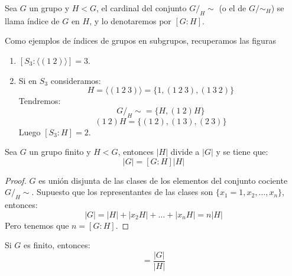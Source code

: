 \begin{definicion}
    Sea $G$ un grupo y $H< G$, el cardinal del conjunto $G/_H\sim$ (o el de $G/\sim_H$) se llama índice de $G$ en $H$, y lo denotaremos por $[G:H]$.
\end{definicion}

\begin{ejemplo}
    Como ejemplos de índices de grupos en subgrupos, recuperamos las figuras %
    \begin{enumerate}
        \item $[S_3 : \langle (1\ 2) \rangle ] = 3$.
        \item Si en $S_3$ consideramos:
            \begin{equation*}
                H = \langle (1\ 2\ 3) \rangle  = \{1, (1\ 2\ 3), (1\ 3\ 2)\}
            \end{equation*}
            Tendremos:
            \begin{equation*}
                G/_H\sim = \{H, (1\ 2)H\}
            \end{equation*}
            \begin{equation*}
                (1\ 2)H = \{(1\ 2), (1\ 3), (2\ 3)\}
            \end{equation*}
            Luego $[S_3 : H] = 2$.
    \end{enumerate}
\end{ejemplo}

\begin{teo}[de Lagrange] %
    Sea $G$ un grupo finito y $H < G$, entonces $|H|$ divide a $|G|$ y se tiene que:
    \begin{equation*}
        |G| = [G:H]|H|
    \end{equation*}
    \begin{proof}
        $G$ es unión disjunta de las clases de los elementos del conjunto cociente $G/_H\sim$. Supuesto que los representantes de las clases son $\{x_1 = 1, x_2, \ldots, x_n\}$, entonces:
        \begin{equation*}
            |G| = |H| + |x_2H| + \ldots + |x_nH| = n|H|
        \end{equation*}
        Pero tenemos que $n = [G:H]$.
    \end{proof}
\end{teo}

Si $G$ es finito, entonces:
\begin{equation*}
    [G:H] = \dfrac{|G|}{|H|}
\end{equation*}

